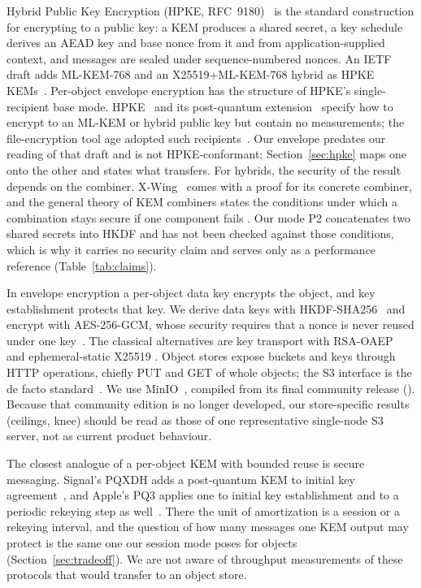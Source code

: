 \documentclass[review,12pt]{elsarticle}
\begin{document}
Hybrid Public Key Encryption (HPKE, RFC~9180)~\cite{rfc9180} is the standard construction for
encrypting to a public key: a KEM produces a shared secret, a key schedule derives an AEAD key
and base nonce from it and from application-supplied context, and messages are sealed under
sequence-numbered nonces. An IETF draft adds ML-KEM-768 and an X25519+ML-KEM-768 hybrid as HPKE
KEMs~\cite{hpkepq}. Per-object envelope encryption has the structure of HPKE's single-recipient
base mode.
HPKE~\cite{rfc9180} and its post-quantum extension~\cite{hpkepq} specify how to encrypt to an
ML-KEM or hybrid public key but contain no measurements; the file-encryption tool age adopted
such recipients~\cite{age2025}. Our envelope predates our reading of that draft and is not
HPKE-conformant; Section~\ref{sec:hpke} maps one onto the other and states what transfers. For
hybrids, the security of the result depends on the combiner. X-Wing~\cite{barbosa2024,xwing}
comes with a proof for its concrete combiner, and the general theory of KEM combiners states the
conditions under which a combination stays secure if one component fails
\cite{giacon2018,bindel2019}.
Our mode P2 concatenates two shared secrets into HKDF and has not been checked against those
conditions, which is why it carries no security claim and serves only as a performance
reference (Table~\ref{tab:claims}).

In envelope encryption a per-object data key encrypts the object, and key establishment protects
that key. We derive data keys with HKDF-SHA256~\cite{rfc5869} and encrypt with AES-256-GCM, whose
security requires that a nonce is never reused under one key~\cite{sp80038d}. The classical
alternatives are key transport with RSA-OAEP~\cite{rfc8017} and ephemeral-static X25519
\cite{rfc7748}. Object stores expose buckets and keys through HTTP operations, chiefly PUT and
GET of whole objects; the S3 interface is the de facto standard~\cite{gadban2021}. We use
MinIO~\cite{minio}, compiled from its final community release (\MinioRelease). Because that
community edition is no longer developed, our store-specific results (ceilings, knee) should be
read as those of one representative single-node S3 server, not as current product behaviour.

The closest analogue of a per-object KEM with bounded reuse is secure messaging. Signal's PQXDH
adds a post-quantum KEM to initial key agreement~\cite{pqxdh2023}, and Apple's PQ3 applies one to
initial key establishment and to a periodic rekeying step as well~\cite{pq32024}. There the unit
of amortization is a session or a rekeying interval, and the question of how many messages one
KEM output may protect is the same one our session mode poses for objects
(Section~\ref{sec:tradeoff}). We are not aware of throughput measurements of these protocols
that would transfer to an object store.
\end{document}
